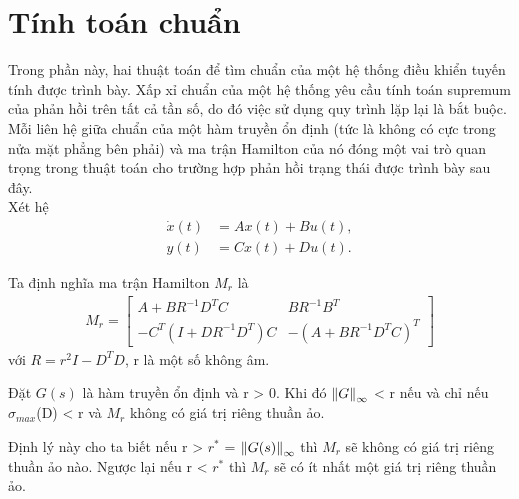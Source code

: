 \section{Tính toán chuẩn \hinf}
Trong phần này, hai thuật toán để tìm chuẩn \hinf của một hệ thống điều khiển tuyến tính được trình bày. Xấp xỉ chuẩn \hinf của một hệ thống yêu cầu tính toán supremum của phản hồi trên tất cả tần số, do đó việc sử dụng quy trình lặp lại là bắt buộc. Mỗi liên hệ giữa chuẩn \hinf của một hàm truyền ổn định (tức là không có cực trong nửa mặt phẳng bên phải) và ma trận Hamilton của nó đóng một vai trò quan trọng trong thuật toán cho trường hợp phản hồi trạng thái được trình bày sau đây.\\
Xét hệ
\begin{align}\label{ct3.1.1}
    \dot{x}(t) &= Ax(t) + Bu(t),\\
    y(t) &= Cx(t) + Du(t).\nonumber
\end{align}
\begin{definition}
Ta định nghĩa ma trận Hamilton $M_r$ là
\begin{align}\label{ct3.1.2}
    M_r = \begin{bmatrix}
        A + BR^{-1}D^{T}C & BR^{-1}B^{T}\\
        -C^{T}(I + DR^{-1}D^{T})C & -(A + BR^{-1}D^{T}C)^{T}
    \end{bmatrix}
\end{align}
với $R = r^2I - D^{T}D$, r là một số không âm.
\end{definition}
\begin{theorem}\label{dly3.1.1}
Đặt $G(s)$ là hàm truyền ổn định và r > 0. Khi đó $\norm{G}_\infty$ < r nếu và chỉ nếu $\sigma_{max}$(D) < r và $M_r$ không có giá trị riêng thuần ảo.
\end{theorem}
Định lý này cho ta biết nếu r > $r^{*}$ = $\norm{G(s)}_\infty$ thì $M_r$ sẽ không có giá trị riêng thuần ảo nào. Ngược lại nếu r < $r^{*}$ thì $M_r$ sẽ có ít nhất một giá trị riêng thuần ảo.

